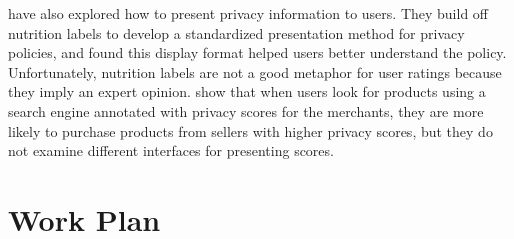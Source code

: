 \documentclass[11pt]{article}
\begin{document}
\citet{nutrition-labels-SOUPS09} have also explored how to 
present privacy information to users.
They build off nutrition labels to develop a standardized 
presentation method for privacy policies, and found this 
display format helped users better understand the policy. 
Unfortunately, nutrition labels are not a good 
metaphor for user ratings because they imply an expert 
opinion. \citet{privacy-purchasing-effect-INFORMS11} 
show that when users look for products using a search engine 
annotated with privacy scores for the merchants, they are more 
likely to purchase products from sellers with higher privacy scores,
but they do not examine different interfaces for presenting
scores.


\section{Work Plan}
\end{document}
